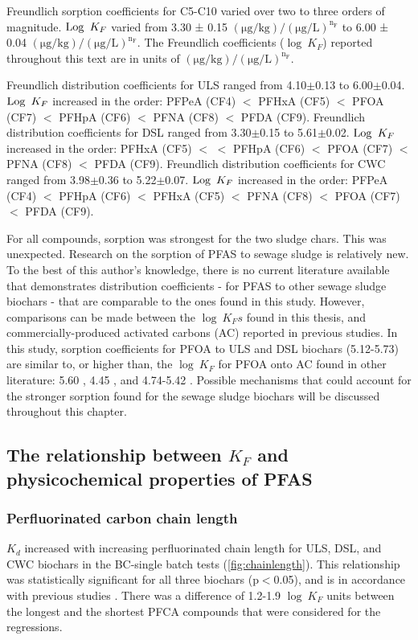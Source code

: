 Freundlich sorption coefficients for C5-C10 varied over two to three orders of magnitude. $\operatorname{Log}~K_{F}$ varied from 3.30 ± 0.15 $\mathrm{(\mu g/kg)/(\mu g/L)^{n_F}}$ to 6.00 ± 0.04 $\mathrm{(\mu g/kg)/(\mu g/L)^{n_F}}$. The Freundlich coefficients ($\log~K_F$) reported throughout this text are in units of $\mathrm{(\mu g/kg)/(\mu g/L)^{n_F}}$. 

Freundlich distribution coefficients for ULS ranged from 4.10$\pm$0.13 to 6.00$\pm$0.04. $\operatorname{Log}~K_F$ increased in the order: PFPeA (CF4) $<$ PFHxA (CF5) $<$ PFOA (CF7) $<$ PFHpA (CF6) $<$ PFNA (CF8) $<$ PFDA (CF9). Freundlich distribution coefficients for DSL ranged from 3.30$\pm$0.15 to 5.61$\pm$0.02. $\operatorname{Log}~K_F$ increased in the order: PFHxA (CF5) $<$ $<$ PFHpA (CF6) $<$ PFOA (CF7) $<$ PFNA (CF8) $<$ PFDA (CF9). Freundlich distribution coefficients for CWC ranged from 3.98$\pm$0.36 to 5.22$\pm$0.07. $\operatorname{Log}~K_F$ increased in the order: PFPeA (CF4) $<$ PFHpA (CF6) $<$ PFHxA (CF5) $<$ PFNA (CF8) $<$ PFOA (CF7) $<$ PFDA (CF9).

For all compounds, sorption was strongest for the two sludge chars. This was unexpected. Research on the sorption of PFAS to sewage sludge is relatively new. To the best of this author's knowledge, there is no current literature available that demonstrates distribution coefficients - for PFAS to other sewage sludge biochars - that are comparable to the ones found in this study. However, comparisons can be made between the $\log~K_Fs$ found in this thesis, and commercially-produced activated carbons (AC) reported in previous studies. In this study, sorption coefficients for PFOA to ULS and DSL biochars (5.12-5.73) are similar to, or higher than, the $\log~K_F$ for PFOA onto AC found in other literature: 5.60 \citep{Kupryianchyk2016b}, 4.45 \citep{hansen2010sorption}, and 4.74-5.42 \citep{silvani2019can}. Possible mechanisms that could account for the stronger sorption found for the sewage sludge biochars will be discussed throughout this chapter. 

 

\subsection{The relationship between $K_F$ and physicochemical properties of PFAS} 
\subsubsection{Perfluorinated carbon chain length}
$K_d$ increased with increasing perfluorinated chain length for ULS, DSL, and CWC biochars in the BC-single batch tests (\cref{fig:chainlength}). This relationship was statistically significant for all three biochars (p$<$0.05), and is in accordance with previous studies \citep{Sorengard2019, fabregat2022examining, ahmed2020per}. There was a difference of 1.2-1.9 $\log~K_F$ units between the longest and the shortest PFCA compounds that were considered for the regressions.

